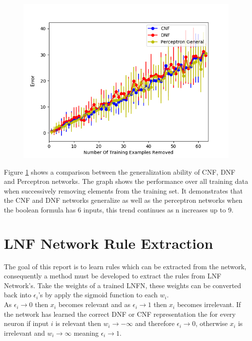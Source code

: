 \begin{figure}[H]
	\centering
	\begin{minipage}[b]{0.8\textwidth}
		\includegraphics[width=\textwidth]{6-generalization.png}
		\caption{}
		\label{fig:generalization-peformance-6}
	\end{minipage}
	\hfill
\end{figure}

Figure \ref{fig:generalization-peformance-6} shows a comparison between the generalization ability of CNF, DNF and Perceptron networks. The graph shows the performance over all training data when successively removing elements from the training set. It demonstrates that the CNF and DNF networks generalize as well as the perceptron networks when the boolean formula has 6 inputs, this trend continues as n increases up to 9.

\section{LNF Network Rule Extraction}
The goal of this report is to learn rules which can be extracted from the network, consequently a method must be developed to extract the rules from LNF Network's. Take the weights of a trained LNFN, these weights can be converted back into $\epsilon_i$'s by apply the sigmoid function to each $w_i$.\\

As $\epsilon_i \rightarrow 0$ then $x_i$ becomes relevant and as $\epsilon_i \rightarrow 1$ then $x_i$ becomes irrelevant. If the network has learned the correct DNF or CNF representation the for every neuron if input $i$ is relevant then $w_i \rightarrow -\infty$ and therefore $\epsilon_i \rightarrow 0$, otherwise $x_i$ is irrelevant and  $w_i \rightarrow \infty$ meaning $\epsilon_i \rightarrow 1$.\\

